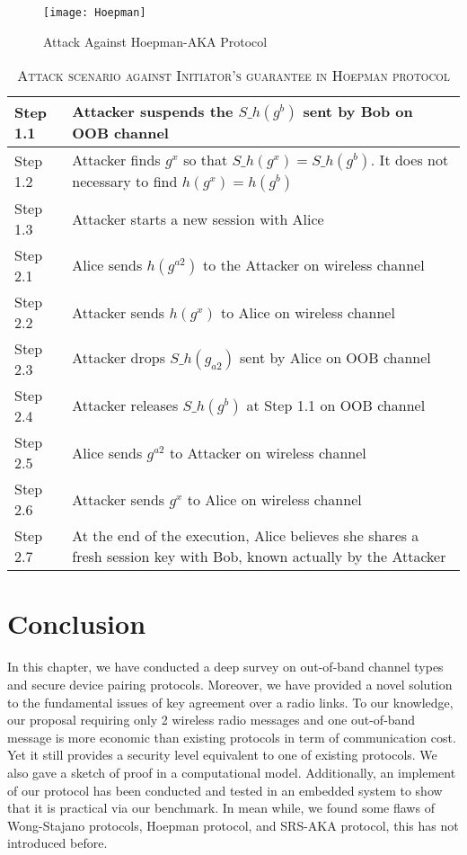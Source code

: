 \begin{figure}
  \centering
  \texttt{[image: Hoepman]}
  \caption{Attack Against Hoepman-AKA Protocol}
  \label{Hoepman}
\end{figure}

\begin{table}[t]
\centering
\caption{\textsc{Attack scenario against Initiator's guarantee in Hoepman protocol}}
\label{Hoepmantable}
{\small
\begin{tabular}{| l | p{11cm} |}
 \hline
 Step 1.1 & Attacker suspends the $S\_h(g^b)$ sent by Bob on OOB channel\\ \hline
 Step 1.2 & Attacker finds $g^x$ so that $S\_h(g^x) = S\_h(g^b)$. It does not necessary to find $h(g^x) = h(g^b)$  \\ \hline
 Step 1.3 & Attacker starts a new session with Alice\\ \hline \hline
 Step 2.1 & Alice sends $h(g^{a2})$ to the Attacker on wireless channel\\ \hline
 Step 2.2 & Attacker sends $h(g^{x})$ to Alice on wireless channel\\ \hline
 Step 2.3 & Attacker drops $S\_h(g_{a2})$ sent by Alice on OOB channel\\ \hline
 Step 2.4 & Attacker releases $S\_h(g^b)$ at Step 1.1 on OOB channel \\ \hline
 Step 2.5 & Alice sends $g^{a2}$ to Attacker on wireless channel \\ \hline
 Step 2.6 & Attacker sends $g^{x}$ to Alice on wireless channel\\ \hline
 Step 2.7 & At the end of the execution, Alice believes she shares a fresh session key with Bob, known actually by the Attacker\\ \hline
\end{tabular}
}
\end{table}

\section{Conclusion}

In this chapter, we have conducted a deep survey on out-of-band channel types and secure device pairing protocols. Moreover, we have provided a novel solution to the fundamental issues of key agreement over a radio links. To our knowledge, our proposal requiring only 2 wireless radio messages and one out-of-band message is more economic than existing protocols in term of communication cost. Yet it still provides a security level equivalent to one of existing protocols. We also gave a sketch of proof in a computational model. Additionally, an implement of our protocol has been conducted and tested in an embedded system to show that it is practical via our benchmark. In mean while, we found some flaws of Wong-Stajano protocols, Hoepman protocol, and SRS-AKA protocol, this has not introduced before. 




